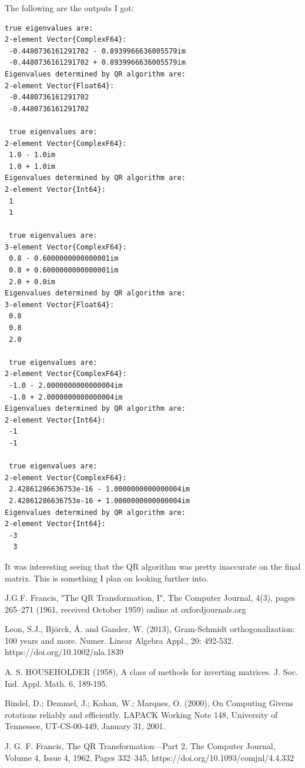 \documentclass[onecolumn]{webofc}
\begin{document}
The following are the outputs I got:
\begin{lstlisting}
true eigenvalues are: 
2-element Vector{ComplexF64}:
 -0.4480736161291702 - 0.8939966636005579im
 -0.4480736161291702 + 0.8939966636005579im
Eigenvalues determined by QR algorithm are: 
2-element Vector{Float64}:
 -0.4480736161291702
 -0.4480736161291702
 
 true eigenvalues are: 
2-element Vector{ComplexF64}:
 1.0 - 1.0im
 1.0 + 1.0im
Eigenvalues determined by QR algorithm are: 
2-element Vector{Int64}:
 1
 1
 
 true eigenvalues are: 
3-element Vector{ComplexF64}:
 0.8 - 0.6000000000000001im
 0.8 + 0.6000000000000001im
 2.0 + 0.0im
Eigenvalues determined by QR algorithm are: 
3-element Vector{Float64}:
 0.8
 0.8
 2.0
 
 true eigenvalues are: 
2-element Vector{ComplexF64}:
 -1.0 - 2.0000000000000004im
 -1.0 + 2.0000000000000004im
Eigenvalues determined by QR algorithm are: 
2-element Vector{Int64}:
 -1
 -1
 
 true eigenvalues are: 
2-element Vector{ComplexF64}:
 2.42861286636753e-16 - 1.0000000000000004im
 2.42861286636753e-16 + 1.0000000000000004im
Eigenvalues determined by QR algorithm are: 
2-element Vector{Int64}:
 -3
  3
\end{lstlisting}

It was interesting seeing that the QR algorithm was pretty inaccurate on the final matrix. This is something I plan on looking further into.


 \begin{thebibliography}{9}

J.G.F. Francis, "The QR Transformation, I", The Computer Journal, 4(3), pages 265–271 (1961, received October 1959) online at oxfordjournals.org

Leon, S.J., Björck, Å. and Gander, W. (2013), Gram-Schmidt orthogonalization: 100 years and more. Numer. Linear Algebra Appl., 20: 492-532. https://doi.org/10.1002/nla.1839

A. S. HOUSEHOLDER (1958), A class of methods for inverting matrices. J. Soc. Ind. Appl. Math. 6, 189-195.

Bindel, D.; Demmel, J.; Kahan, W.; Marques, O. (2000), On Computing Givens rotations reliably and efficiently. LAPACK Working Note 148, University of Tennessee, UT-CS-00-449, January 31, 2001.

J. G. F. Francis, The QR Transformation—Part 2, The Computer Journal, Volume 4, Issue 4, 1962, Pages 332–345, https://doi.org/10.1093/comjnl/4.4.332

 \end{thebibliography}
\end{document}
